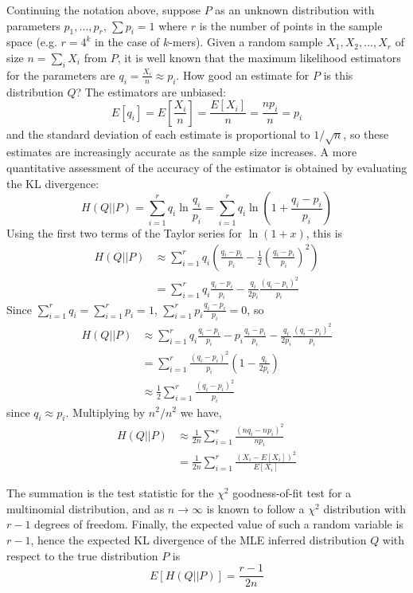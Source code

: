 \documentclass[letterpaper]{article}
\begin{document}
Continuing the notation above, suppose $P$ as an unknown distribution with
parameters $p_1, \dots, p_r$, $\sum p_i = 1$ where $r$ is the number of points
in the sample space (e.g. $r = 4^{k}$ in the case of $k$-mers). Given a random
sample $X_1, X_2, \dots, X_r$ of size $n = \sum_{i} X_i$ from $P$, it is well
known that the maximum likelihood estimators for the parameters are $q_i =
\frac{X_i}{n} \approx p_i$. How good an estimate for $P$ is this distribution
$Q$? The estimators are unbiased:
$$E[q_i] = E\left[\frac{X_i}{n}\right] = \frac{E[X_i]}{n} = \frac{np_i}{n} =
p_i$$
and the standard deviation of each estimate is proportional to $1/\sqrt{n}$, so
these estimates are increasingly accurate as the sample size increases. A more
quantitative assessment of the accuracy of the estimator is obtained by
evaluating the KL divergence:
$$H(Q||P)
= \sum_{i = 1}^{r} q_i \ln \frac{q_i}{p_i}
= \sum_{i = 1}^{r} q_i \ln \left(1 + \frac{q_i - p_i}{p_i} \right) $$
Using the first two terms of the Taylor series for $\ln (1 + x)$, this is
\begin{align*}
H(Q||P) &\approx \sum_{i = 1}^{r} q_i \left( \frac{q_i - p_i}{p_i} -
\frac{1}{2} \left( \frac{q_i - p_i}{p_i} \right)^2 \right ) \\
&= \sum_{i = 1}^{r} q_i \frac{q_i - p_i}{p_i} -
\frac{q_i}{2 p_i} \frac{(q_i - p_i)^2} {p_i}
\end{align*}
Since $\sum_{i = 1}^{r} q_i = \sum_{i = 1}^{r} p_i = 1$,
$\sum_{i = 1}^{r} p_i \frac{q_i - p_i}{p_i} = 0$, so
\begin{align*}
H(Q||P) &\approx \sum_{i=1}^{r} q_i \frac{q_i - p_i}{p_i} - p_i \frac{q_i -
p_i}{p_i} - \frac{q_i}{2 p_i} \frac{(q_i - p_i)^2}{p_i} \\
&= \sum_{i=1}^{r} \frac{(q_i - p_i)^2}{p_i}\left(1 - \frac{q_i}{2 p_i}\right) \\
&\approx \frac{1}{2} \sum_{i=1}^{r} \frac{(q_i - p_i)^2}{p_i}
\end{align*}
since $q_i \approx p_i$. Multiplying by $n^2 / n^2$ we have,
\begin{align*}
H(Q||P) &\approx \frac{1}{2n} \sum_{i=1}^{r} \frac{(n q_i - n p_i)^2}{n p_i} \\
        &= \frac{1}{2n} \sum_{i=1}^{r} \frac{(X_i - E[X_i])^2}{E[X_i]}
\end{align*}

The summation is the test statistic for the $\chi^2$ goodness-of-fit test for a
multinomial distribution, and as $n \rightarrow \infty$ is known to follow a
$\chi^2$ distribution with $r - 1$ degrees of freedom. Finally, the expected
value of such a random variable is $r - 1$, hence the expected KL divergence of
the MLE inferred distribution $Q$ with respect to the true distribution $P$ is
\begin{equation}
\label{eq:entropy}
E[H(Q||P)] = \frac{r - 1}{2n}
\end{equation}
\end{document}
